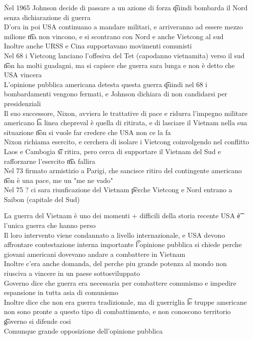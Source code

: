 \documentclass[12pt]{article}
\begin{document}
\v

Nel 1965 Johnson decide di passare a un azione di forza \t quindi bombarda il Nord senza dichiarazione di guerra \\
D'ora in poi USA continuano a mandare militari, e arriveranno ad essere mezzo milione \t ma non vincono, e si scontrano con Nord e anche Vietcong al sud \\
Inoltre anche URSS e Cina supportavano movimenti comunisti \\
Nel 68 i Vietcong lanciano l'offesiva del Tet (capodanno vietnamita) verso il sud \t non ha molti guadagni, ma si capisce che guerra sara lunga e non è detto che USA vincera \\
L'opinione pubblica americana detesta questa guerra \t quindi nel 68 i bombardamenti vengono fermati, e Johnson dichiara di non candidarsi per presidenziali \\
Il suo successore, Nixon, avviera le trattative di pace e ridurra l'impegno militare americano \t la linea chepreval è quella di ritirata, e di lasciare il Vietnam nella sua situazione \t non si vuole far credere che USA non ce la fa \\
Nixon richiama esercito, e cerchera di isolare i Vietcong coinvolgendo nel conflitto Laos e Cambogia \t si ritira, pero cerca di supportare il Vietnam del Sud e rafforzarne l'esercito \t ma fallira \\
Nel 73 firmato armistizio a Parigi, che sancisce ritiro del contingente americano \t non è una pace, me un "me ne vado" \\
Nel 75 ? ci sara riunficazione del Vietnam \t perche Vietcong e Nord entrano a Saibon (capitale del Sud)

\v

La guerra del Vietnam è uno dei momenti + difficili della storia recente USA \t è l'unica guerra che hanno perso \\
Il loro intervento viene condannato a livello internazionale, e USA devono affrontare contestazione interna importante \t l'opinione pubblica si chiede perche giovani americani dovevano andare a combattere in Vietnam \\
Inoltre c'era anche domanda, del perche piu grande potenza al mondo non riusciva a vincere in un paese sottosviluppato \\
Governo dice che guerra era necessaria per combattere comunismo e impedire espansione in tutta asia di comunismo \\
Inoltre dice che non era guerra tradizionale, ma di guerriglia \t le truppe americane non sono pronte a questo tipo di combattimento, e non conoscono territorio \t governo si difende cosi \\
Comunque grande opposizione dell'opinione pubblica
\end{document}
